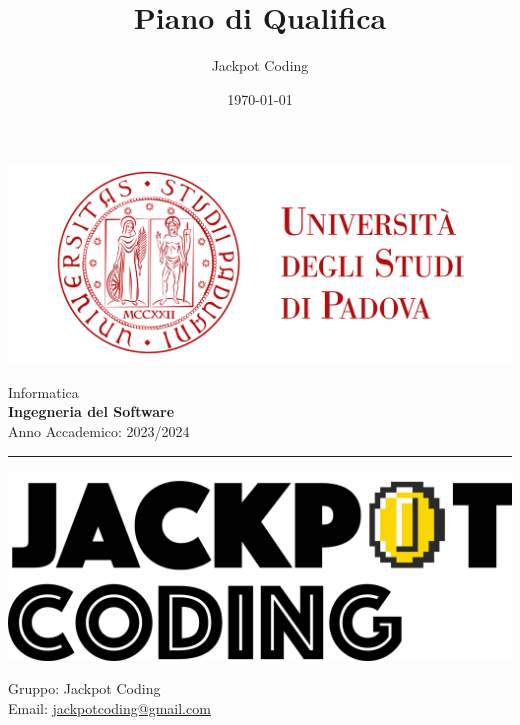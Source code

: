 \documentclass[5pt]{article}
\title{Piano di Qualifica}
\author{Jackpot Coding}
\date{\today}
\begin{document}
	
	
	
	\vspace{8pt}
	\includegraphics[scale=0.2]{UNIPDFull.png}
	
	\vspace{30pt}
	
	\begin{minipage}[t]{0.48\textwidth}
		\begin{flushleft}
			Informatica\\
			\vspace{5pt}
			\textbf{\LARGE Ingegneria del Software}\\
			Anno Accademico: 2023/2024
		\end{flushleft}
	\end{minipage}
	
	
	\vspace{5px}
	
	
	\rule{\textwidth}{5pt}
	
	\begin{minipage}[t]{0.50\textwidth}
		\begin{flushleft}
			\hspace{10pt}
			\includegraphics[scale=0.65]{jackpot-logo.png} 
		\end{flushleft}
	\end{minipage}
	\hspace{-60pt} %
	\begin{flushright}
		\begin{minipage}[t]{0.50\textwidth}
			\begin{flushright}
				Gruppo: {\Large Jackpot Coding}\\
				Email: \href{mailto:jackpotcoding@gmail.com}{jackpotcoding@gmail.com}
			\end{flushright}
		\end{minipage}
	\end{flushright}
	
\end{document}

